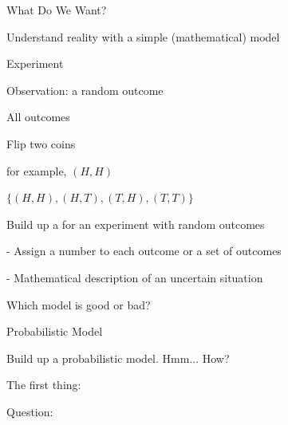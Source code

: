 \begin{frame}{What Do We Want?}


\hspace{-0.2in} Understand reality with a simple (mathematical) model


{
\bci [$\circ$] 
\item<1-> Experiment

\item<2-> Observation: a random outcome

\item<3-> All outcomes
\eci 
}
{
\bci [$\circ$] 
\item<1-> Flip two coins

\item<2-> for example, $(H,H)$

\item<3-> $\{ (H,H), (H,T), (T,H), (T,T) \}$

\eci 
}
\separator

\bci

\item<4->  Build up a  for an experiment with random outcomes


\item<6->  

- Assign a number to each outcome or a set of outcomes

- Mathematical description of an uncertain situation

\item<7-> Which model is good or bad?

\eci
\end{frame}

\begin{frame}{Probabilistic Model}

 Build up a probabilistic model. Hmm... How?

The first thing: 

\bigskip

\bigskip

\alert{Question:} 

\end{frame}

